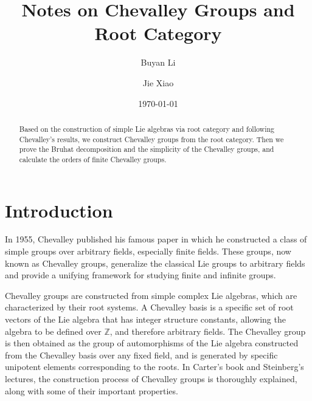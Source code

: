 \documentclass[12pt]{amsart}
\begin{document}
\title[Notes on Chevalley Groups and Root Category]
{Notes on Chevalley Groups and Root Category \uppercase\expandafter{}}%



\author[Buyan Li]{Buyan Li}
\address{Department of Mathematical Sciences, Tsinghua University, Beijing 100084, P. R. China}

\author[Jie Xiao]{Jie Xiao}
\address{School of Mathematical Sciences, Beijing Normal University, Beijing 100875, P. R. China}



\date{\today}










\maketitle

\begin{abstract}
    Based on the construction of simple Lie algebras via root category and following Chevalley's results, we construct Chevalley groups from the root category.
    Then we prove the Bruhat decomposition and the simplicity of the Chevalley groups, and calculate the orders of finite Chevalley groups.
\end{abstract}

\setcounter{tocdepth}{1}\tableofcontents

\section{Introduction}

In 1955, Chevalley published his famous paper\cite{Chevalley} in which he constructed a class of simple groups over arbitrary fields, especially finite fields.
These groups, now known as Chevalley groups, generalize the classical Lie groups to arbitrary fields and provide a unifying framework for studying finite and infinite groups. 

Chevalley groups are constructed from simple complex Lie algebras, which are characterized by their root systems. 
A Chevalley basis is a specific set of root vectors of the Lie algebra that has integer structure constants, allowing the algebra to be defined over $\mathbb{Z}$, and therefore arbitrary fields.
The Chevalley group is then obtained as the group of automorphisms of the Lie algebra constructed from the Chevalley basis over any fixed field, and is generated by specific unipotent elements corresponding to the roots.
In Carter's book\cite{carter} and Steinberg's lectures\cite{Steinberg}, the construction process of Chevalley groups is thoroughly explained, along with some of their important properties.
\end{document}
